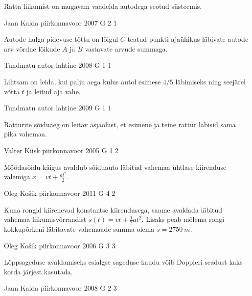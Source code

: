 \documentclass[11pt]{article}
\begin{document}
{{\ifHint
Ratta liikumist on mugavam vaadelda autodega seotud süsteemis.
\fi
}

{Jaan Kalda} %
{piirkonnavoor} %
{2007} %
{G 2} %
{1} %
{

\ifHint
Autode hulga pidevuse tõttu on lõigul $C$ teatud punkti ajaühikus läbivate autode arv võrdne lõikude $A$ ja $B$ vastavate arvude summaga.
\fi
}

{Tundmatu autor} %
{lahtine} %
{2008} %
{G 1} %
{1} %
{

\ifHint
Lihtsam on leida, kui palju aega kulus autol esimese $4/5$ läbimiseks ning seejärel võtta $t$ ja leitud aja vahe.
\fi
}

{Tundmatu autor} %
{lahtine} %
{2009} %
{G 1} %
{1} %
{

\ifHint
Ratturite sõiduaeg on leitav asjaolust, et esimene ja teine rattur läbisid sama pika vahemaa.
\fi
}

{Valter Kiisk} %
{piirkonnavoor} %
{2005} %
{G 1} %
{2} %
{

\ifHint
Möödasõidu käigus avaldub sõiduauto läbitud vahemaa ühtlase kiirenduse valemiga $x = vt + \frac{at^2}{2}$.
\fi
}

{Oleg Košik} %
{piirkonnavoor} %
{2011} %
{G 4} %
{2} %
{

\ifHint
Kuna rongid kiirenevad konstantse kiirendusega, saame avaldada läbitud vahemaa liikumisvõrrandist $s(t) = vt + \frac{1}{2}at^2$. Lisaks peab mõlema rongi kokkupõrkeni läbitavate vahemaade summa olema $s = \SI{2750}{m}$.
\fi
}

{Oleg Košik} %
{piirkonnavoor} %
{2006} %
{G 3} %
{3} %
{

\ifHint
Lõppsageduse avaldamiseks esialgse sageduse kaudu võib Doppleri seadust kaks korda järjest kasutada.
\fi
}

{Jaan Kalda} %
{piirkonnavoor} %
{2008} %
{G 2} %
{3} %
{

}}
\end{document}
